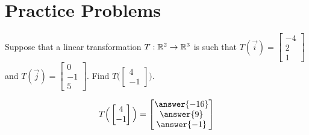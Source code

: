 \documentclass{ximera}
\begin{document}



\section*{Practice Problems}

\begin{problem}\label{prob:evaluateT}
Suppose that a linear transformation $T:\mathbb{R}^2\rightarrow\mathbb{R}^3$ is such that  $T(\vec{i})=\begin{bmatrix}-4\\2\\1\end{bmatrix}$ and $T(\vec{j})=\begin{bmatrix}0\\-1\\5\end{bmatrix}$.  Find $T\Big(\begin{bmatrix}4\\-1\end{bmatrix}\Big)$.

$$T\Big(\begin{bmatrix}4\\-1\end{bmatrix}\Big)=\begin{bmatrix}\answer{-16}\\\answer{9}\\\answer{-1}\end{bmatrix}$$
\end{problem}
\end{document}
